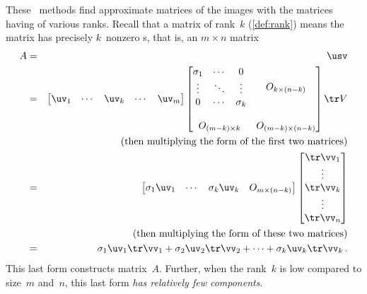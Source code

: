 These \svd\ methods find approximate matrices of the images with the matrices having of various ranks.
Recall that a matrix of rank~\(k\) (\autoref{def:rank}) means the matrix has precisely \(k\)~nonzero s, that is, an \(m\times n\) matrix
\begin{eqnarray*}
A&=&\usv
\\&=&
\begin{bmatrix} \uv_1&\cdots&\uv_k&\cdots&\uv_m \end{bmatrix}
\begin{bmatrix} \begin{matrix} \sigma_1&\cdots&0\\
\vdots&\ddots&\vdots\\
0&\cdots&\sigma_k \end{matrix} & 
O_{k\times (n-k)}\\\,\\
O_{(m-k)\times k}&O_{(m-k)\times (n-k)}\end{bmatrix}
\tr V
\\&&(\text{then multiplying the form of the first two matrices})
\\&=&
\begin{bmatrix} \sigma_1\uv_1&\cdots&\sigma_k\uv_k&O_{m\times(n-k)} \end{bmatrix}
\begin{bmatrix} \tr\vv_1\\\vdots\\\tr\vv_k\\\vdots\\\tr\vv_n \end{bmatrix}
\\&&(\text{then multiplying the form of these two matrices})
\\&=&
\sigma_1\uv_1\tr\vv_1+\sigma_2\uv_2\tr\vv_2+\cdots+\sigma_k\uv_k\tr\vv_k\,.
\end{eqnarray*}
This last form constructs matrix~\(A\).
Further, when the rank~\(k\) is low compared to size~\(m\) and~\(n\), this last form \emph{has relatively few components}.




